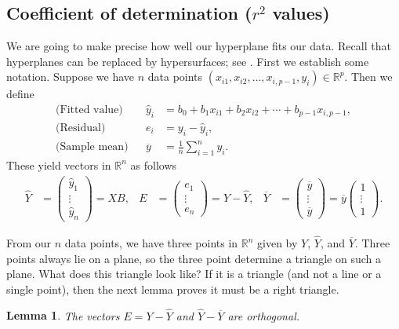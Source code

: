 \documentclass[a4paper, 12pt]{article}
\numberwithin{equation}{section}
\numberwithin{figure}{section}
\newtheorem{lem}[thm]{Lemma}
\theoremstyle{definition}
\newcommand{\R}{\mathbb{R}}
\begin{document}
\subsection{Coefficient of determination ($r^2$ values)}

We are going to make precise how well our hyperplane fits our data. Recall that
hyperplanes can be replaced by hypersurfaces; see .
First we establish some notation. Suppose we have $n$ data points $(x_{i1},
x_{i2}, \dots, x_{i,p-1}, y_i)\in \R^p$. Then we define  
\begin{align*}
	\text{(Fitted value)} & & \widehat{y}_i &= b_0 + b_1x_{i1} + b_2 x_{i2} + \cdots + b_{p-1} x_{i,p-1}, \\
	\text{(Residual)} & & e_i &= y_i - \widehat{y}_i, \\
	\text{(Sample mean)} & & \overline{y} &= \frac{1}{n}\sum_{i=1}^n y_i.
\end{align*}
These yield vectors in $\R^n$ as follows 
\begin{align*}
	\widehat{Y} &= \begin{pmatrix}
		\widehat{y}_1 \\ \vdots \\ \widehat{y}_n
	\end{pmatrix} = XB, & 
	E &= \begin{pmatrix}
		e_1 \\ \vdots \\ e_n
	\end{pmatrix} = Y - \widehat{Y}, & 
	\overline{Y} &= \begin{pmatrix}
		\overline{y} \\ \vdots \\ \overline{y}
	\end{pmatrix} = \overline{y} \begin{pmatrix}
		1 \\ \vdots \\ 1 
	\end{pmatrix}. 
\end{align*}

From our $n$ data points, we have three points in $\R^n$ given by $Y$,
$\widehat{Y}$, and $\overline{Y}$. Three points always lie on a plane, so the
three point determine a triangle on such a plane. What does this triangle look
like? If it is a triangle (and not a line or a single point), then the next
lemma proves it must be a right triangle.

\begin{lem}\label{lem:orthog}
	The vectors $E = Y - \widehat{Y}$ and $\widehat{Y}-\overline{Y}$ are
	orthogonal.
\end{lem}
\end{document}
